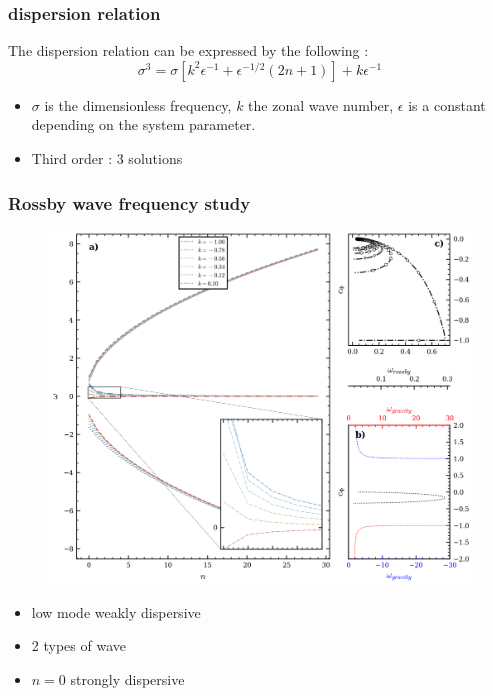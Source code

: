 \documentclass[numbering=fraction]{beamer}
\begin{document}
\begin{frame}
    \frametitle{dispersion relation}
    The dispersion relation can be expressed by the following :
    \begin{equation}
        \label{eq:7}
        \sigma^3 = \sigma [k^2 \epsilon^{-1} + \epsilon^{-1/2}(2n + 1)] + k\epsilon^{-1}
    \end{equation}
    \begin{itemize}
        \item $\sigma$ is the dimensionless frequency, $k$ the zonal wave number, $\epsilon$ is a constant depending on the system parameter.
        \item Third order : 3 solutions
    \end{itemize}
\end{frame}

\begin{frame}
    \frametitle{Rossby wave frequency study}
    \begin{minipage}{.7\linewidth}
        \begin{figure}[H]
            \includegraphics[width=1\linewidth]{./figure/roots.png}
            \label{fig:}
        \end{figure}
    \end{minipage}
    \hfill
    \begin{minipage}{.28\linewidth}
        \begin{itemize}
            \item low mode weakly dispersive
            \item 2 types of wave
            \item $n = 0$ strongly dispersive
        \end{itemize}
    \end{minipage}
\end{frame}
\end{document}

